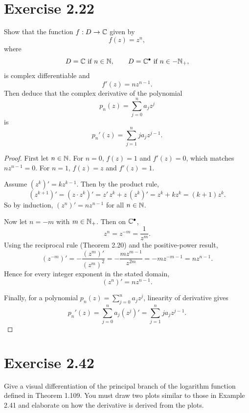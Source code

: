 \documentclass{article}
\begin{document}
\section{Exercise 2.22}

Show that the function $f : D \to \mathbb{C}$ given by
\[
  f(z) = z^n,
\]
where
\[
  D = \mathbb{C} \text{ if } n \in \mathbb{N},
  \qquad
  D = \mathbb{C}^\bullet \text{ if } n \in -\mathbb{N}_+,
\]
is complex differentiable and
\[
  f'(z)=n z^{n-1}.
\]
Then deduce that the complex derivative of the polynomial
\[
  p_n(z)=\sum_{j=0}^{n} a_j z^j
\]
is
\[
  p_n'(z)=\sum_{j=1}^{n} j a_j z^{j-1}.
\]

\begin{proof}
  First let $n\in\mathbb{N}$. For $n=0$, $f(z)=1$ and $f'(z)=0$, which matches
  $nz^{n-1}=0$. For $n=1$, $f(z)=z$ and $f'(z)=1$.

  Assume $(z^k)'=kz^{k-1}$. Then by the product rule,
  \[
    (z^{k+1})'=(z\cdot z^k)'=z'\,z^k+z\,(z^k)'=z^k+kz^k=(k+1)z^k.
  \]
  So by induction, $(z^n)'=nz^{n-1}$ for all $n\in\mathbb{N}$.

  Now let $n=-m$ with $m\in\mathbb{N}_+$. Then on $\mathbb{C}^\bullet$,
  \[
    z^n=z^{-m}=\frac{1}{z^m}.
  \]
  Using the reciprocal rule (Theorem 2.20) and the positive-power result,
  \[
    (z^{-m})'=-\frac{(z^m)'}{(z^m)^2}
    =-\frac{mz^{m-1}}{z^{2m}}
    =-mz^{-m-1}
    =nz^{n-1}.
  \]
  Hence for every integer exponent in the stated domain,
  \[
    (z^n)'=nz^{n-1}.
  \]

  Finally, for a polynomial $p_n(z)=\sum_{j=0}^n a_j z^j$, linearity of
  derivative gives
  \[
    p_n'(z)=\sum_{j=0}^n a_j (z^j)'
    =\sum_{j=1}^n j a_j z^{j-1}.
  \]
\end{proof}

\section{Exercise 2.42}

Give a visual differentiation of the principal branch of the logarithm
function defined in Theorem 1.109.
You must draw two plots similar to those in Example 2.41 and elaborate on
how the derivative is derived from the plots.
\end{document}
